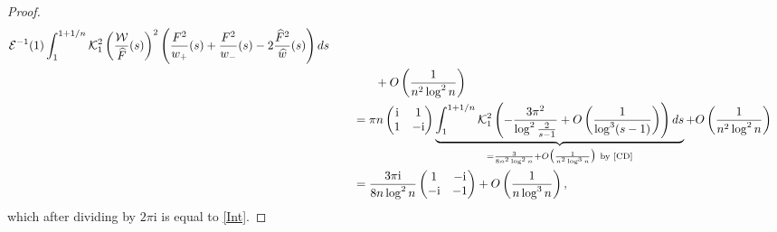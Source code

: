 \documentclass[11pt]{article}
\numberwithin{equation}{section}
\newcommand{\cK}{\mathcal{K}}
\newcommand{\cE}{\mathcal{E}}
\newcommand{\cW}{\mathcal{W}}
\newcommand{\hw}{\widehat w}
\newcommand{\hF}{\widehat F}
\newcommand{\hFw}{\frac{\hF^2}{\hw}}
\newcommand{\I}{\mathrm{i}}
\numberwithin{equation}{section}
\begin{document}
\begin{proof}
\begin{align}
 \cE^{-1}(1)
 \int_1^{1+1/n} \cK^2_1\left(\frac{\cW}{\hF}(s)\right)^2\left(\frac{F^2}{w_+}(s)+\frac{F^2}{w_-}(s)-2\hFw(s)\right) {\rm d}s\nonumber
 \\
 &\phantom{\qquad=\times}{}+ O\left(\frac{1}{n^2\log^2 n}\right)\nonumber
 \\
 &\qquad= \pi n \begin{pmatrix}
 \I & 1
 \\
 1 & -\I
 \end{pmatrix}
 \underbrace{\int_1^{1+1/n} \cK^2_1 \left(-\frac{3\pi^2}{\log^2 \frac{2}{s-1}} + O\left(\frac{1}{\log^3(s-1)}\right)\right) {\rm d}s }_{= \frac{3}{8 n^2\log^2 n} + O\big(\frac{1}{n^2\log^3 n}\big) \ \text{by \cite[Proposition~C.1]{CD}}}
 + O\left(\frac{1}{n^2\log^2 n}\right)\nonumber
 \\
 &\qquad= \frac{3\pi\I}{8n \log^2n} \begin{pmatrix}
1 & -\I\\
-\I & -1
\end{pmatrix}+ O\left(\frac{1}{n\log^3 n}\right),\label{firstFormula}
\end{align}
which after dividing by $2\pi \I$ is equal to \eqref{Int}.


\end{proof}
\end{document}

